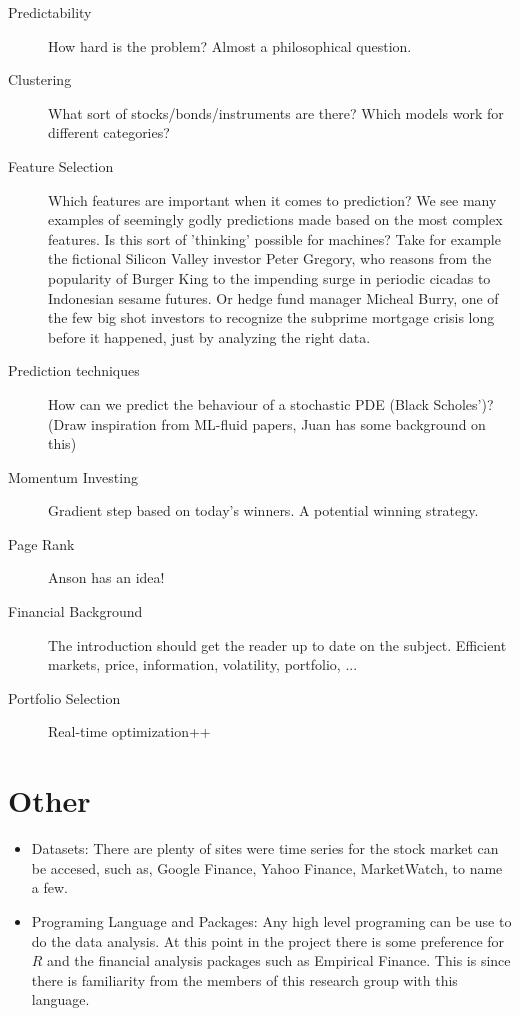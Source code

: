 \documentclass[12pt, oneside]{article}
\begin{document}
\begin{description}

\item[Predictability] How hard is the problem? Almost a philosophical question. 

\item[Clustering] What sort of stocks/bonds/instruments are there? Which models work for different categories?

\item[Feature Selection] Which features are important when it comes to prediction? We see many examples of seemingly godly predictions made based on the most complex features. Is this sort of 'thinking' possible for machines? Take for example the fictional Silicon Valley investor Peter Gregory, who reasons from the popularity of Burger King to the impending surge in periodic cicadas to Indonesian sesame futures. Or hedge fund manager Micheal Burry, one of the few big shot investors to recognize the subprime mortgage crisis long before it happened, just by analyzing the right data.

\item[Prediction techniques] How can we predict the behaviour of a stochastic PDE (Black Scholes')? (Draw inspiration from ML-fluid papers, Juan has some background on this)

\item[Momentum Investing] Gradient step based on today's winners. A potential winning strategy.

\item[Page Rank] Anson has an idea!

\item[Financial Background] The introduction should get the reader up to date on the subject. Efficient markets, price, information, volatility, portfolio, ...

\item[Portfolio Selection] Real-time optimization++

\end{description}

\section{Other}

\begin{itemize}

\item Datasets: There are plenty of sites were time series for the stock market can be accesed, such as, Google Finance, Yahoo Finance, MarketWatch, to name a few. 

\item Programing Language and Packages: Any high level programing can be use to do the data analysis. At this point in the project there is some preference for $R$ 
and the financial analysis packages such as Empirical Finance. This is since there
is familiarity from the members of this research group with this language. 

\end{itemize}
\end{document}
